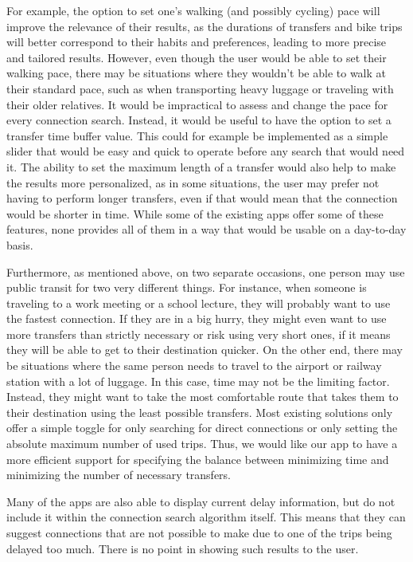 For example, the option to set one's walking (and possibly cycling) pace will improve the relevance of their results, as the durations of transfers and bike trips will better correspond to their habits and preferences, leading to more precise and tailored results. However, even though the user would be able to set their walking pace, there may be situations where they wouldn't be able to walk at their standard pace, such as when transporting heavy luggage or traveling with their older relatives. It would be impractical to assess and change the pace for every connection search. Instead, it would be useful to have the option to set a transfer time buffer value. This could for example be implemented as a simple slider that would be easy and quick to operate before any search that would need it.
The ability to set the maximum length of a transfer would also help to make the results more personalized, as in some situations, the user may prefer not having to perform longer transfers, even if that would mean that the connection would be shorter in time.
While some of the existing apps offer some of these features, none provides all of them in a way that would be usable on a day-to-day basis.

Furthermore, as mentioned above, on two separate occasions, one person may use public transit for two very different things. For instance, when someone is traveling to a work meeting or a school lecture, they will probably want to use the fastest connection. If they are in a big hurry, they might even want to use more transfers than strictly necessary or risk using very short ones, if it means they will be able to get to their destination quicker. On the other end, there may be situations where the same person needs to travel to the airport or railway station with a lot of luggage. In this case, time may not be the limiting factor. Instead, they might want to take the most comfortable route that takes them to their destination using the least possible transfers. Most existing solutions only offer a simple toggle for only searching for direct connections or only setting the absolute maximum number of used trips. Thus, we would like our app to have a more efficient support for specifying the balance between minimizing time and minimizing the number of necessary transfers.

Many of the apps are also able to display current delay information, but do not include it within the connection search algorithm itself. This means that they can suggest connections that are not possible to make due to one of the trips being delayed too much. There is no point in showing such results to the user.

